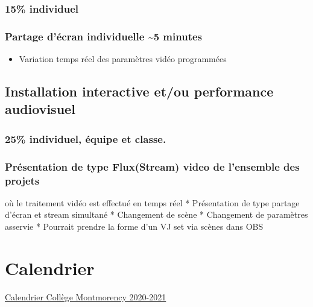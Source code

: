 \documentclass[
]{book}
\providecommand{\tightlist}{%
  \setlength{\itemsep}{0pt}\setlength{\parskip}{0pt}}
\begin{document}
\hypertarget{individuel-3}{%
\subsection{15\% individuel}\label{individuel-3}}

\hypertarget{partage-duxe9cran-individuelle-5-minutes-1}{%
\subsection{Partage d'écran individuelle \textasciitilde5 minutes}\label{partage-duxe9cran-individuelle-5-minutes-1}}

\begin{itemize}
\tightlist
\item
  Variation temps réel des paramètres vidéo programmées
\end{itemize}

\hypertarget{sommatif_6}{%
\section{Installation interactive et/ou performance audiovisuel}\label{sommatif_6}}

\hypertarget{individuel-uxe9quipe-et-classe.}{%
\subsection{25\% individuel, équipe et classe.}\label{individuel-uxe9quipe-et-classe.}}

\hypertarget{pruxe9sentation-de-type-fluxstream-video-de-lensemble-des-projets}{%
\subsection{Présentation de type Flux(Stream) video de l'ensemble des projets}\label{pruxe9sentation-de-type-fluxstream-video-de-lensemble-des-projets}}

où le traitement vidéo est effectué en temps réel
* Présentation de type partage d'écran et stream simultané
* Changement de scène
* Changement de paramètres asservie
* Pourrait prendre la forme d'un VJ set via scènes dans OBS

\hypertarget{calendrier}{%
\chapter{Calendrier}\label{calendrier}}

\href{https://www.cmontmorency.qc.ca/wp-content/uploads/images/college/administration/CALENDRIER-SCOLAIRE-2020-2021.pdf}{Calendrier Collège Montmorency 2020-2021}
\end{document}
